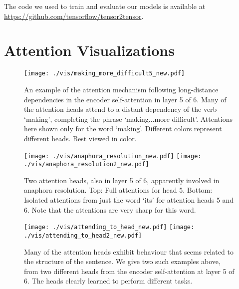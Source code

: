 The code we used to train and evaluate our models is available at \url{https://github.com/tensorflow/tensor2tensor}.

\pagebreak
\section*{Attention Visualizations}\label{sec:viz-att}
\begin{figure*}[h]
{\texttt{[image: ./vis/making\_more\_difficult5\_new.pdf]}}
\caption{An example of the attention mechanism following long-distance dependencies in the encoder self-attention in layer 5 of 6. Many of the attention heads attend to a distant dependency of the verb `making', completing the phrase `making...more difficult'.  Attentions here shown only for the word `making'. Different colors represent different heads. Best viewed in color.}
\end{figure*}

\begin{figure*}
{\texttt{[image: ./vis/anaphora\_resolution\_new.pdf]}}
{\texttt{[image: ./vis/anaphora\_resolution2\_new.pdf]}}
\caption{Two attention heads, also in layer 5 of 6, apparently involved in anaphora resolution. Top: Full attentions for head 5. Bottom: Isolated attentions from just the word `its' for attention heads 5 and 6. Note that the attentions are very sharp for this word.}
\end{figure*}

\begin{figure*}
{\texttt{[image: ./vis/attending\_to\_head\_new.pdf]}}
{\texttt{[image: ./vis/attending\_to\_head2\_new.pdf]}}
\caption{Many of the attention heads exhibit behaviour that seems related to the structure of the sentence. We give two such examples above, from two different heads from the encoder self-attention at layer 5 of 6. The heads clearly learned to perform different tasks.}
\end{figure*}



